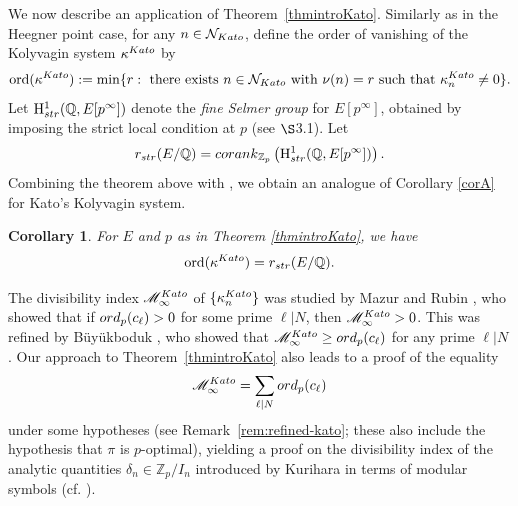\documentclass[10pt,reqno]{amsart}
\numberwithin{equation}{section}
\theoremstyle{plain}
\theoremstyle{definition}
\newtheorem{rmk}[thm]{Remark}
\theoremstyle{definition}
\theoremstyle{plain}
\theoremstyle{plain}
\theoremstyle{plain}
\theoremstyle{plain}
\theoremstyle{plain}
\theoremstyle{plain}
\newtheorem{corintro}{Corollary}
\DeclareMathOperator{\ord}{ord}
\newcommand{\Z}{\mathbb{Z}}
\newcommand{\Q}{\mathbb{Q}}
\newcommand{\rH}{\mathrm{H}}
\begin{document}
We now describe an application of Theorem~\ref{thmintroKato}. 
Similarly as in the Heegner point case, 
for any $n\in\mathcal{N}_{\rm Kato}$, 
define the order of vanishing of the Kolyvagin system $\kappa^{\rm Kato}$ by
\[
\ord(\kappa^{\rm Kato}):= \min \{r: \text{ there exists }n\in \mathcal{N}_{\rm Kato} \text{ with } \nu(n)=r \text{ such that }\kappa_n^{\rm Kato}\neq 0\}.
\]
Let $\rH^1_{\rm str}(\Q,E[p^\infty])$ denote the \emph{fine Selmer group} for $E[p^{\infty}]$, obtained by imposing the strict local condition at $p$ (see $\S$3.1). Let 
$$r_{\rm str}(E/\Q)= {\rm corank}_{\Z_p}\left(\rH^1_{\rm str}(\Q,E[p^\infty])\right).$$
Combining the theorem above with \cite[Theorem 5.2.12(v)]{mazrub}, we obtain an analogue of Corollary \ref{corA} for Kato's Kolyvagin system.
\setcounter{corintro}{2}
\begin{corintro}
For $E$ and $p$ as in Theorem \ref{thmintroKato}, we have 
\[
\ord(\kappa^{\rm Kato})= r_{\rm str}(E/\Q).
\]
\end{corintro}

The divisibility index $\mathscr{M}_\infty^{\rm Kato}$ of  $\{\kappa_n^{\rm Kato}\}$ was studied by Mazur and Rubin  %
\cite[\S{6.2}]{mazrub}, who showed that if ${\rm ord}_p(c_\ell)>0$ for some prime $\ell\vert N$, then $\mathscr{M}_\infty^{\rm Kato}>0$. This was  refined by Büy\"{u}kboduk \cite{kazim}, who showed that $\mathscr{M}_\infty^{\rm Kato}\geq{\rm ord}_p(c_\ell)$ for any prime $\ell\vert N$. 
Our approach to Theorem~\ref{thmintroKato} also leads to a proof of the equality
\[
\mathscr{M}_\infty^{\rm Kato}=\sum_{\ell\mid N}{\rm ord}_p(c_\ell)
\] 
under some hypotheses (see Remark~\ref{rem:refined-kato}; these also include the hypothesis that $\pi$ is $p$-optimal), yielding a proof \cite[Conj.~1.9]{kim} on the divisibility index of the analytic quantities $\delta_n\in\Z_p/I_n$ introduced by Kurihara \cite{kur-Iw2012} in terms of modular symbols (cf. \cite{kurihara-sakamoto}). 



\end{document}
